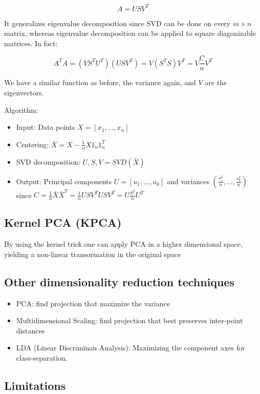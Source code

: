 \documentclass[11pt]{article}
\begin{document}
\[A = USV^T\]

It generalizes eigenvalue decomposition since SVD can be done on every
\(m\times n\) matrix, whereas eigenvalue decomposition can be applied to
square diagonizable matrices. In fact:

\[A^TA=(VS^TU^T)(USV^T)=V(S^TS)V^T=V\frac{C}{n}V^T\]

We have a similar function as before, the variance again, and \(V\) are
the eigenvectors.

Algorithm:

\begin{itemize}
\tightlist
\item
  Input: Data points \(X=[x_1, ..., x_n]\)
\item
  Centering: \(\bar X = X - \frac{1}{n}X1_n1_n^T\)
\item
  SVD decomposition: \(U, S, V = SVD(\bar X)\)
\item
  Output: Principal components \(U = [u_1, ..., u_k]\) and variances
  \((\frac{s_i^2}{n}, ..., \frac{s_k^2}{n})\) since
  \(C = \frac{1}{n} \bar X \bar X^T = \frac{1}{n}USV^TUSV^T= U\frac{S^2}{n}U^T\)
\end{itemize}

\subsection{Kernel PCA (KPCA)}\label{kernel-pca-kpca}

By using the kernel trick one can apply PCA in a higher dimensional
space, yielding a non-linear transormation in the original space

\subsection{Other dimensionality reduction
techniques}\label{other-dimensionality-reduction-techniques}

\begin{itemize}
\tightlist
\item
  PCA: find projection that maximize the variance
\item
  Multidimensional Scaling: find projection that best preserves
  inter-point distances
\item
  LDA (Linear Discriminan Analysis): Maximizing the component axes for
  class-separation.
\end{itemize}

\subsection{Limitations}\label{limitations-1}
\end{document}
